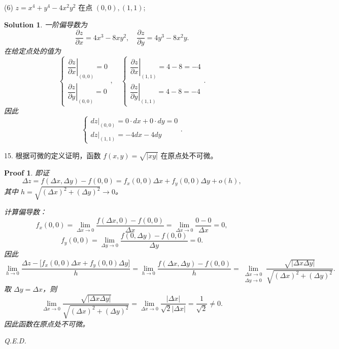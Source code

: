 \documentclass[a4paper,12pt]{article}
\newtheorem*{pf}{Proof}
\newtheorem*{sol}{Solution}
\begin{document}
(6) $z = x^4 + y^4 - 4x^2y^2$ 在点 $(0,0),(1,1)$;
\begin{sol}
    一阶偏导数为
    $$
        \frac{\partial z}{\partial x} = 4x^3 - 8xy^2, \quad \frac{\partial z}{\partial y} = 4y^3 - 8x^2y.
    $$
    在给定点处的值为
    $$
        \begin{cases}
            \left.\dfrac{\partial z}{\partial x}\right|_{(0,0)} = 0 \\
            \left.\dfrac{\partial z}{\partial y}\right|_{(0,0)} = 0
        \end{cases}, \quad
        \begin{cases}
            \left.\dfrac{\partial z}{\partial x}\right|_{(1,1)} = 4 - 8 = -4 \\
            \left.\dfrac{\partial z}{\partial y}\right|_{(1,1)} = 4 - 8 = -4
        \end{cases}.
    $$
    因此
    $$
        \begin{cases}
            dz|_{(0,0)} = 0\cdot dx + 0\cdot dy = 0 \\
            dz|_{(1,1)} = -4dx - 4dy
        \end{cases}.
    $$
\end{sol}


15. 根据可微的定义证明，函数 $f(x,y) = \sqrt{|xy|}$ 在原点处不可微。
\begin{pf}
    即证
    $$
        \Delta z = f(\Delta x,\Delta y) - f(0,0) = f_x(0,0)\Delta x + f_y(0,0)\Delta y + o(h),
    $$
    其中 $h = \sqrt{(\Delta x)^2 + (\Delta y)^2} \to 0$。

    计算偏导数：
    $$
        f_x(0,0) = \lim_{\Delta x \to 0}\frac{f(\Delta x,0) - f(0,0)}{\Delta x} = \lim_{\Delta x \to 0}\frac{0 - 0}{\Delta x} = 0,
    $$
    $$
        f_y(0,0) = \lim_{\Delta y \to 0}\frac{f(0,\Delta y) - f(0,0)}{\Delta y} = 0.
    $$
    因此
    $$
        \lim_{h \to 0}\frac{\Delta z - \big[f_x(0,0)\Delta x + f_y(0,0)\Delta y\big]}{h} = \lim_{h \to 0}\frac{f(\Delta x,\Delta y) - f(0,0)}{h} = \lim_{\substack{\Delta x \to 0 \\ \Delta y \to 0}}\frac{\sqrt{|\Delta x\Delta y|}}{\sqrt{(\Delta x)^2 + (\Delta y)^2}}.
    $$
    取 $\Delta y = \Delta x$，则
    $$
        \lim_{\Delta x \to 0}\frac{\sqrt{|\Delta x\Delta y|}}{\sqrt{(\Delta x)^2 + (\Delta y)^2}} = \lim_{\Delta x \to 0}\frac{|\Delta x|}{\sqrt{2}|\Delta x|} = \frac{1}{\sqrt{2}} \neq 0.
    $$
    因此函数在原点处不可微。

    Q.E.D.
\end{pf}
\end{document}
